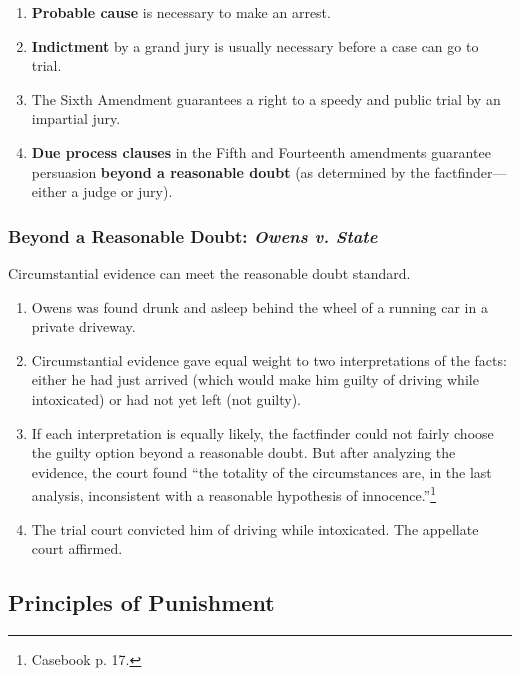 \begin{enumerate}
\begin{enumerate}
        \item Judgment is collective---it isn't about two 
        parties.\footnote{See Schelling, ``Ethics, Law, and the Exercise of 
        Self-Command.''}
    \end{enumerate}
    \item \textbf{Probable cause} is necessary to make an arrest.
    \item \textbf{Indictment} by a grand jury is usually necessary before a 
    case can go to trial.
    \item The Sixth Amendment guarantees a right to a speedy and public trial
    by an impartial jury.
    \item \textbf{Due process clauses} in the Fifth and Fourteenth amendments 
    guarantee persuasion \textbf{beyond a reasonable doubt} (as determined by 
    the factfinder---either a judge or jury).
\end{enumerate}

\subsubsection{Beyond a Reasonable Doubt: \emph{Owens v. State}}

Circumstantial evidence can meet the reasonable doubt standard.

\begin{enumerate}
    \item Owens was found drunk and asleep behind the wheel of a running car 
    in a private driveway.
    \item Circumstantial evidence gave equal weight to two interpretations of 
    the facts: either he had just arrived (which would make him guilty of 
    driving while intoxicated) or had not yet left (not guilty).
    \item If each interpretation is equally likely, the factfinder could not 
    fairly choose the guilty option beyond a reasonable doubt. But after 
    analyzing the evidence, the court found ``the totality of the 
    circumstances are, in the last analysis, inconsistent with a reasonable 
    hypothesis of innocence.''\footnote{Casebook p. 17.}
    \item The trial court convicted him of driving while intoxicated. The 
    appellate court affirmed.
\end{enumerate}

\subsection{Principles of Punishment}

